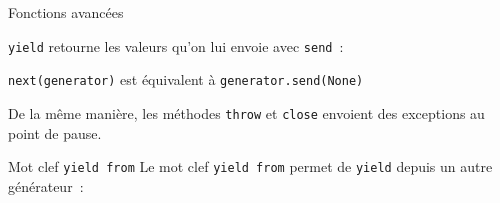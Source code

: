 \begin{frame}{Fonctions avancées}

  \texttt{yield} retourne les valeurs qu'on lui envoie avec \texttt{send}~:


  \texttt{next(generator)} est équivalent à \texttt{generator.send(None)}

  De la même manière, les méthodes \texttt{throw} et \texttt{close} envoient des exceptions au point de pause.
\end{frame}

\begin{frame}{Mot clef \texttt{yield from}}
  Le mot clef \texttt{yield from} permet de \texttt{yield} depuis un autre générateur~:

\end{frame}